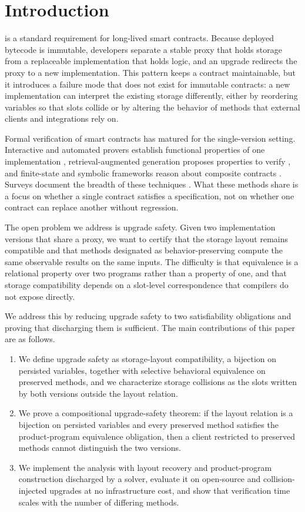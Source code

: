 \documentclass[journal]{IEEEtran}
\begin{document}
\section{Introduction}
 is a standard requirement for long-lived smart contracts. Because deployed bytecode is immutable, developers separate a stable proxy that holds storage from a replaceable implementation that holds logic, and an upgrade redirects the proxy to a new implementation. This pattern keeps a contract maintainable, but it introduces a failure mode that does not exist for immutable contracts: a new implementation can interpret the existing storage differently, either by reordering variables so that slots collide or by altering the behavior of methods that external clients and integrations rely on.

Formal verification of smart contracts has matured for the single-version setting. Interactive and automated provers establish functional properties of one implementation \cite{amani2018, park2020, dill2022-move}, retrieval-augmented generation proposes properties to verify \cite{liu2025-propertygpt}, and finite-state and symbolic frameworks reason about composite contracts \cite{almakhour2022, doan2024}. Surveys document the breadth of these techniques \cite{tolmach2021}. What these methods share is a focus on whether a single contract satisfies a specification, not on whether one contract can replace another without regression.

The open problem we address is upgrade safety. Given two implementation versions that share a proxy, we want to certify that the storage layout remains compatible and that methods designated as behavior-preserving compute the same observable results on the same inputs. The difficulty is that equivalence is a relational property over two programs rather than a property of one, and that storage compatibility depends on a slot-level correspondence that compilers do not expose directly.

We address this by reducing upgrade safety to two satisfiability obligations and proving that discharging them is sufficient. The main contributions of this paper are as follows.
\begin{enumerate}
\item We define upgrade safety as storage-layout compatibility, a bijection on persisted variables, together with selective behavioral equivalence on preserved methods, and we characterize storage collisions as the slots written by both versions outside the layout relation.
\item We prove a compositional upgrade-safety theorem: if the layout relation is a bijection on persisted variables and every preserved method satisfies the product-program equivalence obligation, then a client restricted to preserved methods cannot distinguish the two versions.
\item We implement the analysis with layout recovery and product-program construction discharged by a solver, evaluate it on open-source and collision-injected upgrades at no infrastructure cost, and show that verification time scales with the number of differing methods.
\end{enumerate}
\end{document}
